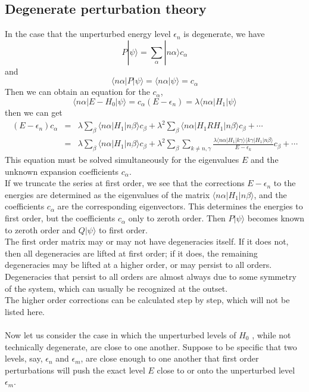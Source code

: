 \subsection{Degenerate perturbation theory}
In the case that the unperturbed energy level $\epsilon_n$ is degenerate, we have
\[P|\psi\rangle = \sum_{\alpha} |n\alpha\rangle c_{\alpha}\]
and
\[\langle n\alpha | P |\psi\rangle = \langle n\alpha  |\psi\rangle = c_{\alpha}\]
Then we can obtain an equation for the $c_{\alpha}$,
\[\langle n\alpha | E-H_0 | \psi\rangle = c_{\alpha}(E-\epsilon_n) = \lambda \langle n\alpha | H_1 | \psi\rangle\]
then we can get
\begin{eqnarray}
(E-\epsilon_{n})c_{\alpha} &=& \lambda \sum_{\beta} \langle n\alpha | H_1 | n\beta\rangle c_{\beta} + \lambda^2 \sum_{\beta} \langle n\alpha | H_1RH_1 | n\beta\rangle c_{\beta} + \cdots \\
&=& \lambda \sum_{\beta} \langle n\alpha | H_1 | n\beta\rangle c_{\beta}
+ \lambda^2 \sum_{\beta} \sum_{k\neq n,\gamma}  \frac{\lambda \langle n\alpha | H_1|k\gamma\rangle \langle k\gamma | H_1 | n\beta \rangle}{E-\epsilon_k}c_{\beta} + \cdots \nonumber
\end{eqnarray}
This equation must be solved simultaneously for the eigenvalues $E$ and the unknown expansion coefficients $c_{\alpha}$.\\
If we truncate the series at first order, we see that the corrections $E-\epsilon_{n}$ to the energies are determined as the eigenvalues of the matrix $\langle n\alpha | H_1 | n\beta\rangle$, and the coefficients $c_{\alpha}$ are the corresponding eigenvectors.
This determines the energies to first order, but the coefficients $c_{\alpha}$ only to zeroth order. Then $P|\psi\rangle$ becomes known to zeroth order and $Q|\psi\rangle$ to first order.\\
The first order matrix may or may not have degeneracies itself. If it does not, then all degeneracies are lifted at first order; if it does, the remaining degeneracies may be lifted at a higher order, or may persist to all orders. Degeneracies that persist to all orders are almost always due to some symmetry of the system, which can usually be recognized at the outset.\\
The higher order corrections can be calculated step by step, which will not be listed here.\\ \\
Now let us consider the case in which the unperturbed levels of $H_0$ , while not technically degenerate, are close to one another. Suppose to be specific that two levels, say, $\epsilon_n$ and $\epsilon_m$, are close enough to one another that first order perturbations will push the exact level $E$ close to or onto the unperturbed level $\epsilon_m$.\\
